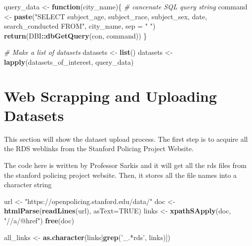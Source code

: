 \documentclass[
]{book}
\newenvironment{Shaded}{\begin{snugshade}}{\end{snugshade}}
\newcommand{\CommentTok}[1]{\textcolor[rgb]{0.56,0.35,0.01}{\textit{#1}}}
\newcommand{\ControlFlowTok}[1]{\textcolor[rgb]{0.13,0.29,0.53}{\textbf{#1}}}
\newcommand{\DataTypeTok}[1]{\textcolor[rgb]{0.13,0.29,0.53}{#1}}
\newcommand{\KeywordTok}[1]{\textcolor[rgb]{0.13,0.29,0.53}{\textbf{#1}}}
\newcommand{\NormalTok}[1]{#1}
\newcommand{\OperatorTok}[1]{\textcolor[rgb]{0.81,0.36,0.00}{\textbf{#1}}}
\newcommand{\OtherTok}[1]{\textcolor[rgb]{0.56,0.35,0.01}{#1}}
\newcommand{\StringTok}[1]{\textcolor[rgb]{0.31,0.60,0.02}{#1}}
\begin{document}
\begin{Shaded}
\begin{Highlighting}[]
\NormalTok{query_data <-}\StringTok{ }\ControlFlowTok{function}\NormalTok{(city_name)\{}
  \CommentTok{# cancenate SQL query string}
\NormalTok{  command <-}\StringTok{ }
\StringTok{    }\KeywordTok{paste}\NormalTok{(}\StringTok{"SELECT subject_age, subject_race, subject_sex, date, search_conducted FROM"}\NormalTok{,}
\NormalTok{         city_name, }\DataTypeTok{sep =} \StringTok{" "}\NormalTok{)}
  \KeywordTok{return}\NormalTok{(DBI}\OperatorTok{::}\KeywordTok{dbGetQuery}\NormalTok{(con, command))}
\NormalTok{\} }

\CommentTok{# Make a list of datasets}
\NormalTok{datasets <-}\StringTok{ }\KeywordTok{list}\NormalTok{()}
\NormalTok{datasets <-}\StringTok{ }\KeywordTok{lapply}\NormalTok{(datasets_of_interest, query_data)}
\end{Highlighting}
\end{Shaded}

\hypertarget{web-scrapping-and-uploading-datasets}{%
\section{Web Scrapping and Uploading Datasets}\label{web-scrapping-and-uploading-datasets}}

This section will show the dataset upload process. The first step is to acquire all the RDS weblinks from the Stanford Policing Project Website.

The code here is written by Professor Sarkis and it will get all the rds files from the stanford policing project website. Then, it stores all the file names into a character string

\begin{Shaded}
\begin{Highlighting}[]
\NormalTok{url <-}\StringTok{ "https://openpolicing.stanford.edu/data/"}
\NormalTok{doc <-}\StringTok{ }\KeywordTok{htmlParse}\NormalTok{(}\KeywordTok{readLines}\NormalTok{(url), }\DataTypeTok{asText=}\OtherTok{TRUE}\NormalTok{)}
\NormalTok{links <-}\StringTok{ }\KeywordTok{xpathSApply}\NormalTok{(doc, }\StringTok{"//a/@href"}\NormalTok{)}
\KeywordTok{free}\NormalTok{(doc)}

\NormalTok{all_links <-}\StringTok{ }\KeywordTok{as.character}\NormalTok{(links[}\KeywordTok{grep}\NormalTok{(}\StringTok{'_.*rds'}\NormalTok{, links)])}
\end{Highlighting}
\end{Shaded}
\end{document}
